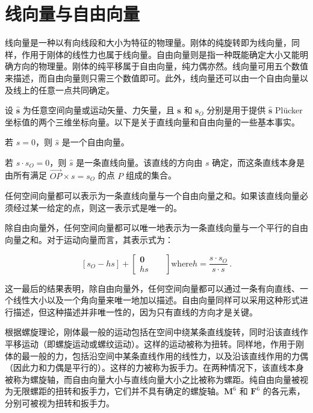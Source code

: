 \documentclass[10pt,a4paper]{book}
\theoremstyle{thmstyle} %
\theoremstyle{defstyle} %
\theoremstyle{prostyle} %
\begin{document}
\section{线向量与自由向量}





线向量是一种以有向线段和大小为特征的物理量。刚体的纯旋转即为线向量，同样，作用于刚体的线性力也属于线向量。自由向量则是指一种既能确定大小又能明确方向的物理量。刚体的纯平移属于自由向量，纯力偶亦然。线向量可用五个数值来描述，而自由向量则只需三个数值即可。此外，线向量还可以由一个自由向量以及线上的任意一点共同确定。



设 $\hat{\mathbf{s}}$ 为任意空间向量或运动矢量、力矢量，且 $\mathbf{s}$ 和 $\mathbf{s}_O$ 分别是用于提供 $\hat{\mathbf{s}}$ Plücker 坐标值的两个三维坐标向量。以下是关于直线向量和自由向量的一些基本事实。



若 $s=0$，则 $\hat{s}$ 是一个自由向量。



若 $s \cdot s_O = 0$，则 $\hat{s}$ 是一条直线向量。该直线的方向由 $s$ 确定，而这条直线本身是由所有满足 $\overrightarrow{OP} \times s = s_O$ 的点 $P$ 组成的集合。



任何空间向量都可以表示为一条直线向量与一个自由向量之和。如果该直线向量必须经过某一给定的点，则这一表示式是唯一的。



除自由向量外，任何空间向量都可以唯一地表示为一条直线向量与一个平行的自由向量之和。对于运动向量而言，其表示式为：



$$
\left[ s _ { O } - h s \right] + \left[ \begin{array}{lll} { { \mathbf { 0 } } } & { { } } & { { } } \\{ { h s } } & { { } } & { { } } \end{array} \right]  \mathrm { w h e r e }  h = \frac { s \cdot s _ { O } } { s \cdot s } \, .
$$



这一最后的结果表明，除自由向量外，任何空间向量都可以通过一条有向直线、一个线性大小以及一个角向量来唯一地加以描述。自由向量同样可以采用这种形式进行描述，但这种描述并非唯一性的，因为只有直线的方向才是关键。



根据螺旋理论，刚体最一般的运动包括在空间中绕某条直线旋转，同时沿该直线作平移运动（即螺旋运动或螺纹运动）。这样的运动被称为扭转。同样地，作用于刚体的最一般的力，包括沿空间中某条直线作用的线性力，以及沿该直线作用的力偶（因此力和力偶是平行的）。这样的力被称为扳手力。在两种情况下，该直线本身被称为螺旋轴，而自由向量大小与直线向量大小之比被称为螺距。纯自由向量被视为无限螺距的扭转和扳手力，它们并不具有确定的螺旋轴。$\mathbf{M}^{6}$ 和 $\mathbf{F}^{6}$ 的各元素，分别可被视为扭转和扳手力。
\end{document}
